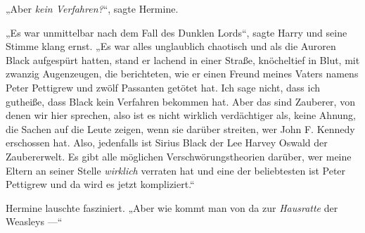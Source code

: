 „Aber \emph{kein Verfahren?}“, sagte Hermine.

„Es war unmittelbar nach dem Fall des Dunklen Lords“, sagte Harry und seine Stimme klang ernst.
„Es war alles unglaublich chaotisch und als die Auroren Black aufgespürt hatten, stand er lachend in einer Straße, knöcheltief in Blut, mit zwanzig Augenzeugen, die berichteten, wie er einen Freund meines Vaters namens Peter Pettigrew und zwölf Passanten getötet hat. Ich sage nicht, dass ich gutheiße, dass Black kein Verfahren bekommen hat. Aber das sind Zauberer, von denen wir hier sprechen, also ist es nicht wirklich verdächtiger als, keine Ahnung, die Sachen auf die Leute zeigen, wenn sie darüber streiten, wer John F. Kennedy erschossen hat. Also, jedenfalls ist Sirius Black der Lee Harvey Oswald der Zaubererwelt. Es gibt alle möglichen Verschwörungstheorien darüber, wer meine Eltern an seiner Stelle \emph{wirklich} verraten hat und eine der beliebtesten ist Peter Pettigrew und da wird es jetzt kompliziert.“

Hermine lauschte fasziniert.
„Aber wie kommt man von da zur \emph{Hausratte} der Weasleys —“

